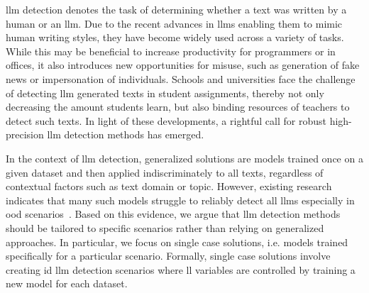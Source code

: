 \ac{llm} detection denotes the task of determining whether a text was written by a human or an \ac{llm}.
Due to the recent advances in \acp{llm} enabling them to mimic human writing styles, they have become widely used across a variety of tasks.
While this may be beneficial to increase productivity for programmers or in offices, it also introduces new opportunities for misuse, such as generation of fake news or impersonation of individuals.
Schools and universities face the challenge of detecting \ac{llm} generated texts in student assignments, thereby not only decreasing the amount students learn, but also binding resources of teachers to detect such texts.
In light of these developments, a rightful call for robust high-precision \ac{llm} detection methods has emerged.

In the context of \ac{llm} detection, generalized solutions are models trained once on a given dataset and then applied indiscriminately to all texts, regardless of contextual factors such as text domain or topic. 
However, existing research indicates that many such models struggle to reliably detect all \acp{llm} especially in \ac{ood} scenarios~\citep{bhattacharjee_fighting_2024,li_learning_2025}.
Based on this evidence, we argue that \ac{llm} detection methods should be tailored to specific scenarios rather than relying on generalized approaches.
In particular, we focus on single case solutions, i.e. models trained specifically for a particular scenario.
Formally, single case solutions involve creating \ac{id} \ac{llm} detection scenarios where ll variables are controlled by training a new model for each dataset.

